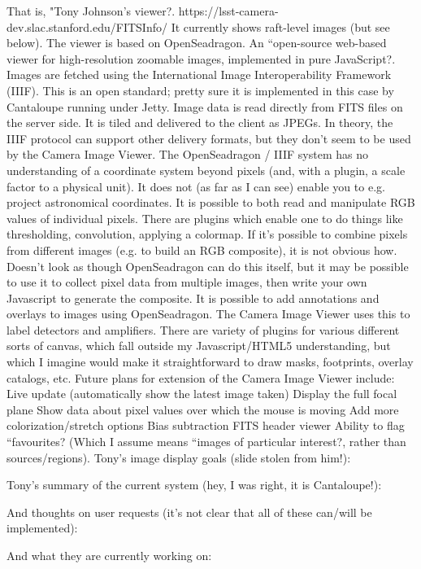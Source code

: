 That is, "Tony Johnson's viewer?.
https://lsst-camera-dev.slac.stanford.edu/FITSInfo/
It currently shows raft-level images (but see below).
The viewer is based on OpenSeadragon.
An ``open-source web-based viewer for high-resolution zoomable images, implemented in pure JavaScript?.
Images are fetched using the International Image Interoperability Framework (IIIF).
This is an open standard; pretty sure it is implemented in this case by Cantaloupe running under Jetty.
Image data is read directly from FITS files on the server side.
It is tiled and delivered to the client as JPEGs.
In theory, the IIIF protocol can support other delivery formats, but they don't seem to be used by the Camera Image Viewer.
The OpenSeadragon / IIIF system has no understanding of a coordinate system beyond pixels (and, with a plugin, a scale factor to a physical unit). It does not (as far as I can see) enable you to e.g. project astronomical coordinates.
It is possible to both read and manipulate RGB values of individual pixels.
There are plugins which enable one to do things like thresholding, convolution, applying a colormap.
If it's possible to combine pixels from different images (e.g. to build an RGB composite), it is not obvious how.
Doesn't look as though OpenSeadragon can do this itself, but it may be possible to use it to collect pixel data from multiple images, then write your own Javascript to generate the composite.
It is possible to add annotations and overlays to images using OpenSeadragon.
The Camera Image Viewer uses this to label detectors and amplifiers.
There are variety of plugins for various different sorts of canvas, which fall outside my Javascript/HTML5 understanding, but which I imagine would make it straightforward to draw masks, footprints, overlay catalogs, etc.
Future plans for extension of the Camera Image Viewer include:
Live update (automatically show the latest image taken)
Display the full focal plane
Show data about pixel values over which the mouse is moving
Add more colorization/stretch options
Bias subtraction
FITS header viewer
Ability to flag ``favourites?
(Which I assume means ``images of particular interest?, rather than sources/regions).
Tony's image display goals (slide stolen from him!):

Tony's summary of the current system (hey, I was right, it is Cantaloupe!):

And thoughts on user requests (it's not clear that all of these can/will be implemented):

And what they are currently working on:

